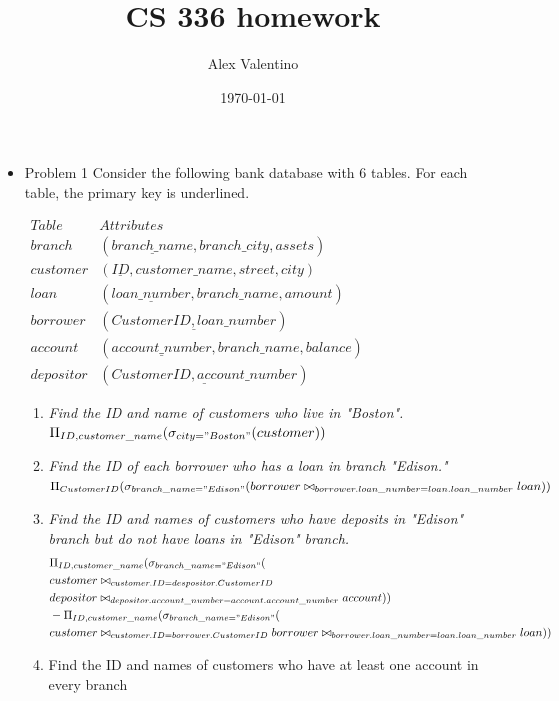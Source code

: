 \documentclass[12pt, letterpaper]{article}
\date{\today}
\author{Alex Valentino}
\title{CS 336 homework}
\begin{document}
\begin{itemize}
	\item{Problem 1} Consider the following bank database with 6 tables. For each table, the primary key is underlined.
	\begin{center}
	$\begin{array}{c|c}
	Table & Attributes\\
	\hline
	branch & (\underline{branch\_name}, branch\_city, assets)\\
	\hline	
	customer & (\underline{ID}, customer\_name, street, city)\\
	\hline	
	loan & (\underline{loan\_number}, branch\_name, amount)\\
	\hline
	borrower & (\underline{CustomerID, loan\_number})\\
	\hline
	account & (\underline{account\_number}, branch\_name, balance)\\
	\hline
	depositor & (\underline{CustomerID, account\_number})
	\end{array}	$
	\end{center}
	\begin{enumerate}
		\item \textit{Find the ID and name of customers who live in "Boston".}\\
		$\Pi_{ID, customer\_name}(\sigma_{city = "Boston"}(customer))$
		\item \textit{Find the ID of each borrower who has a loan in branch "Edison."}\\
		$ \Pi_{CustomerID}(\sigma_{branch\_name = "Edison"}(borrower \bowtie_{borrower.loan\_number = loan.loan\_number} loan))$
		\item \textit{Find the ID and names of customers who have deposits in "Edison" branch but do not have loans in "Edison" branch.}
		\begin{align*}
			& 		\Pi_{ID, customer\_name}(\sigma_{branch\_name = "Edison"}(\\ 
		& customer \bowtie_{customer.ID = despositor.CustomerID}\\
		& depositor
		\bowtie_{depositor.account\_number = account.account\_number} account))\\
		&- \Pi_{ID, customer\_name}(\sigma_{branch\_name = "Edison"}(\\
		&customer \bowtie_{customer.ID = borrower.CustomerID} borrower \bowtie_{borrower.loan\_number = loan.loan\_number} loan))		
		\end{align*}
		\item Find the ID and names of customers who have at least one account in every branch 

\end{enumerate}
\end{itemize}
\end{document}
